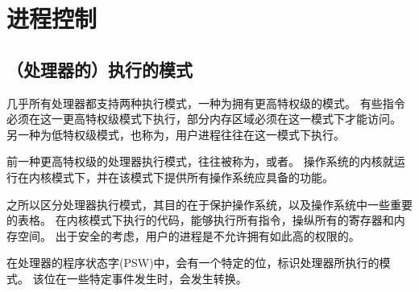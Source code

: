 
\section{进程控制}
{
    \subsection{（处理器的）执行的模式}
    {
        几乎所有处理器都支持两种执行模式，一种为拥有更高特权级的模式。
        有些指令必须在这一更高特权级模式下执行，部分内存区域必须在这一模式下才能访问。
        另一种为低特权级模式，也称为，用户进程往往在这一模式下执行。

        前一种更高特权级的处理器执行模式，往往被称为，或者。
        操作系统的内核就运行在内核模式下，并在该模式下提供所有操作系统应具备的功能。

        之所以区分处理器执行模式，其目的在于保护操作系统，以及操作系统中一些重要的表格。
        在内核模式下执行的代码，能够执行所有指令，操纵所有的寄存器和内存空间。
        出于安全的考虑，用户的进程是不允许拥有如此高的权限的。

        在处理器的程序状态字(PSW)中，会有一个特定的位，标识处理器所执行的模式。
        该位在一些特定事件发生时，会发生转换。
    }
}

